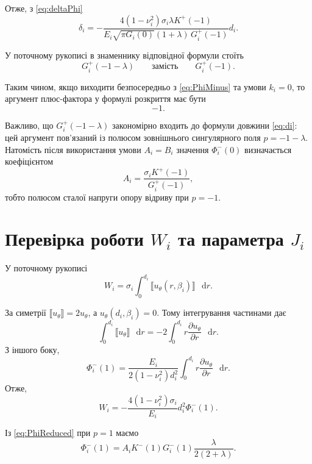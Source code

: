\documentclass[12pt,a4paper]{article}
\newcommand{\dd}{\mathop{}\!\mathrm{d}}
\newcommand{\jump}[1]{\llbracket #1\rrbracket}
\begin{document}
Отже, з \eqref{eq:deltaPhi}
\begin{equation}
\boxed{
  \delta_i=
  -\frac{4(1-\nu_i^2)\sigma_i\lambda K^+(-1)}
  {E_i\sqrt{\pi G_i(0)}(1+\lambda)\,G_i^+(-1)}
  d_i
  }.
\label{eq:deltaDerived}
\end{equation}

У поточному рукописі в знаменнику відповідної формули стоїть
\begin{equation}
\label{eq:deltaManuscript}
  G_i^+(-1-\lambda)
  \qquad\text{замість}\qquad
  G_i^+(-1).
\end{equation}

Таким чином, якщо виходити безпосередньо з
\eqref{eq:PhiMinus} та умови $k_i=0$, то аргумент
плюс-фактора у формулі розкриття має бути
\begin{equation}
  \boxed{-1}.
\end{equation}

Важливо, що $G_i^+(-1-\lambda)$ закономірно входить до
формули довжини \eqref{eq:di}: цей аргумент пов'язаний із полюсом
зовнішнього сингулярного поля $p=-1-\lambda$.
Натомість після використання умови $A_i=B_i$ значення
$\Phi_i^-(0)$ визначається коефіцієнтом
\[
  A_i=
  \frac{\sigma_iK^+(-1)}{G_i^+(-1)},
\]
тобто полюсом сталої напруги опору відриву при $p=-1$.

\section{Перевірка роботи $W_i$ та параметра $J_i$}

У поточному рукописі
\begin{equation}
\label{eq:Wdef}
  W_i=
  \sigma_i\int_0^{d_i}
  \jump{u_\theta(r,\beta_i)}\,\dd r.
\end{equation}

За симетрії $\jump{u_\theta}=2u_\theta$, а
$u_\theta(d_i,\beta_i)=0$. Тому інтегрування частинами дає
\[
  \int_0^{d_i}\jump{u_\theta}\,\dd r
  =
  -2\int_0^{d_i}
  r\frac{\partial u_\theta}{\partial r}\,\dd r.
\]
З іншого боку,
\[
  \Phi_i^-(1)
  =
  \frac{E_i}{2(1-\nu_i^2)d_i^2}
  \int_0^{d_i}
  r\frac{\partial u_\theta}{\partial r}\,\dd r.
\]
Отже,
\begin{equation}
\label{eq:WPhi}
  W_i=
  -\frac{4(1-\nu_i^2)\sigma_i}{E_i}
  d_i^2\Phi_i^-(1).
\end{equation}

Із \eqref{eq:PhiReduced} при $p=1$ маємо
\begin{equation}
\label{eq:Phi1}
  \Phi_i^-(1)
  =
  A_iK^-(1)G_i^-(1)
  \frac{\lambda}{2(2+\lambda)}.
\end{equation}
\end{document}
